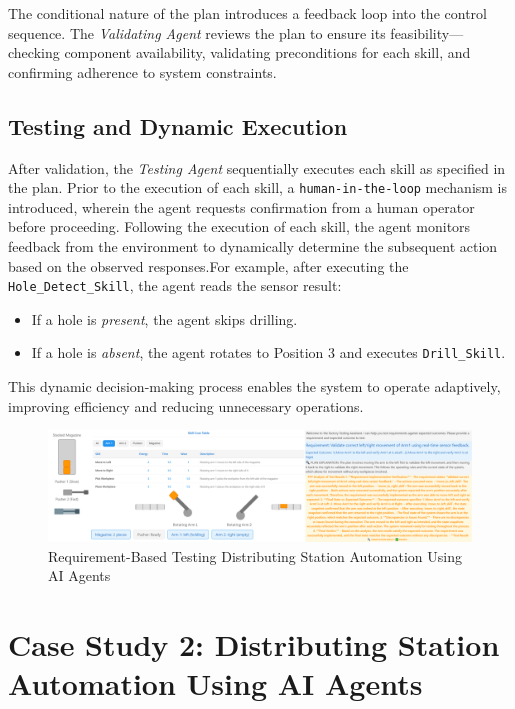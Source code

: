 \begin{bibunit}
    The conditional nature of the plan introduces a feedback loop into the control sequence. The \textit{Validating Agent} reviews the plan to ensure its feasibility—checking component availability, validating preconditions for each skill, and confirming adherence to system constraints.
    
    \subsection{Testing and Dynamic Execution}
    After validation, the \textit{Testing Agent} sequentially executes each skill as specified in the plan. Prior to the execution of each skill, a \texttt{human-in-the-loop} mechanism is introduced, wherein the agent requests confirmation from a human operator before proceeding. Following the execution of each skill, the agent monitors feedback from the environment to dynamically determine the subsequent action based on the observed responses.For example, after executing the \texttt{Hole\_Detect\_Skill}, the agent reads the sensor result:
    \begin{itemize}
        \item If a hole is \textit{present}, the agent skips drilling.
        \item If a hole is \textit{absent}, the agent rotates to Position 3 and executes \texttt{Drill\_Skill}.
    \end{itemize}
    
    This dynamic decision-making process enables the system to operate adaptively, improving efficiency and reducing unnecessary operations.
    
    
    \begin{figure}
        \includegraphics[width=1\textwidth]{MX_Papers/Paper13/images/DS_Arch.png}
        \caption{Requirement-Based Testing Distributing Station Automation Using AI Agents}
        \label{fig:ds_arch}
    \end{figure}
    
    \section{Case Study 2: Distributing Station Automation Using AI Agents}
    

\end{bibunit}
